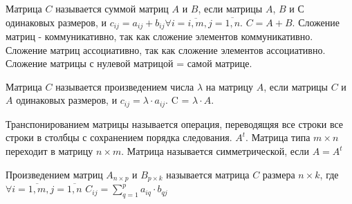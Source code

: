 \documentclass[a4paper,12pt]{article}
\begin{document}
Матрица $C$ называется суммой матриц $A$ и $B$, если матрицы $A$, $B$ и $С$ одинаковых размеров, и $c_{ij} = a_{ij} + b_{ij} \forall i = \overline{i, m}, j = \overline{1, n}$. $C = A+B$. Сложение матриц - коммуникативно, так как сложение элементов коммуникативно. 
Сложение матриц ассоциативно, так как сложение элементов ассоциативно. Сложение матрицы с нулевой матрицой = самой матрице.

Матрица $C$ называется произведением числа $\lambda$ на матрицу $A$, если  матрицы $C$ и $A$ одинаковых размеров, и $c_{ij} = \lambda \cdot a_{ij}$. C = $\lambda \cdot A$.

Транспонированием матрицы называется операция, переводящяя все строки все строки в столбцы с сохранением порядка следования. $A^t$. Матрица типа $m\times n$ переходит в матрицу $n\times m$. Матрица называется симметрической, если $A = A^t$

Произведением матриц $A_{n\times p}$ и $B_{p\times k}$ называется матрица $C$ размера $n\times k$, где $\forall i = \overline{1, m}, j = \overline{1, n}$ $C_{ij} = \sum\limits_{q=1}^p a_{iq} \cdot b_{qj}$
\end{document}
